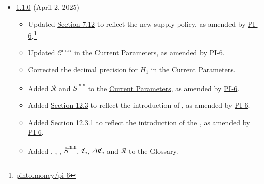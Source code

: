 \documentclass[class=article, crop=false]{standalone}
\begin{document}
\begin{itemize}[topsep=0pt, itemsep=3pt,leftmargin=16pt]
    \item \href{https://github.com/pinto-org/whitepaper/blob/master/version-history/pinto1_1_0.pdf}{1.1.0} (April 2, 2025)
    
    \begin{itemize}
        \item Updated \hyperlink{subsection.7.12}{Section 7.12} to reflect the new  supply policy, as amended by \href{https://pinto.money/pi-6}{PI-6}.\footnote{\href{https://pinto.money/pi-6}{pinto.money/pi-6}} 
        \item Updated $\mathscr{C}^{\text{max}}$ in the \hyperlink{subsection.12.1}{Current Parameters}, as amended by \href{https://pinto.money/pi-6}{PI-6}.
        \item Corrected the decimal precision for $H_{1}$ in the \hyperlink{subsection.12.1}{Current Parameters}.
        \item Added $\mathscr{R}$ and $\overline{S}^{\text{min}}$ to the \hyperlink{subsection.12.1}{Current Parameters}, as amended by \href{https://pinto.money/pi-6}{PI-6}.
        \item Added \hyperlink{subsection.12.3}{Section 12.3} to reflect the introduction of , as amended by \href{https://pinto.money/pi-6}{PI-6}.
        \item Added \hyperlink{subsubsection.12.3.1}{Section 12.3.1} to reflect the introduction of the  , as amended by \href{https://pinto.money/pi-6}{PI-6}.
        \item Added , , , $\overline{S}^{\text{min}}$, $\mathfrak{C}_{t}$, $\Delta \mathfrak{C}_{t}$ and $\mathscr{R}$ to the \hyperlink{subsection.12.15}{Glossary}.
    \end{itemize}
    
\end{itemize}
\end{document}
